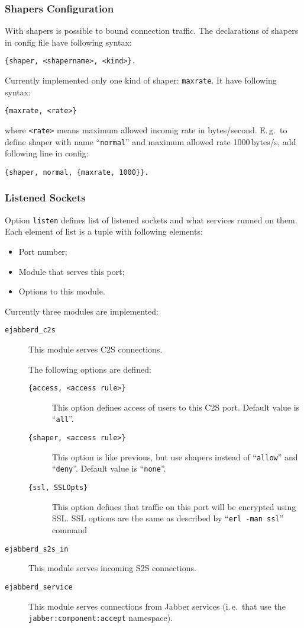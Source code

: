 \documentclass[10pt]{article}
\newcommand{\Jabber}{Jabber}
\begin{document}
\subsubsection{Shapers Configuration}
\label{sec:configshaper}

With shapers is possible to bound connection traffic.  The declarations of
shapers in config file have following syntax:
\begin{verbatim}
{shaper, <shapername>, <kind>}.
\end{verbatim}
Currently implemented only one kind of shaper: \texttt{maxrate}.  It have
following syntax:
\begin{verbatim}
{maxrate, <rate>}
\end{verbatim}
where \texttt{<rate>} means maximum allowed incomig rate in bytes/second.
E.\,g.\ to define shaper with name ``\texttt{normal}'' and maximum allowed rate
1000\,bytes/s, add following line in config:
\begin{verbatim}
{shaper, normal, {maxrate, 1000}}.
\end{verbatim}




\subsubsection{Listened Sockets}
\label{sec:configlistened}

Option \texttt{listen} defines list of listened sockets and what services
runned on them.  Each element of list is a tuple with following elements:
\begin{itemize}
\item Port number;
\item Module that serves this port;
\item Options to this module.
\end{itemize}

Currently three modules are implemented:
\begin{description}
\item[\verb|ejabberd_c2s|] This module serves C2S connections.
  
  The following options are defined:
  \begin{description}
  \item[\verb|{access, <access rule>}|] This option defines access of users
    to this C2S port.  Default value is ``\texttt{all}''.
  \item[\verb|{shaper, <access rule>}|] This option is like previous, but
    use shapers instead of ``\texttt{allow}'' and ``\texttt{deny}''.  Default
    value is ``\texttt{none}''.
  \item[\verb|{ssl, SSLOpts}|] This option defines that traffic on this port
    will be encrypted using SSL.  SSL options are the same as described by
    ``\verb|erl -man ssl|'' command
  \end{description}
\item[\verb|ejabberd_s2s_in|] This module serves incoming S2S connections.
\item[\verb|ejabberd_service|] This module serves connections from \Jabber{}
  services (i.\,e.\ that use the \texttt{jabber:component:accept} namespace).
\end{description}
\end{document}
